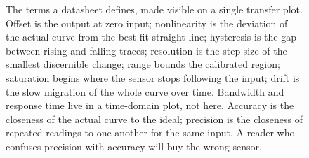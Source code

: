 \begin{figure}[ht]
\begin{tikzpicture}[x=1cm, y=1cm, font=\small]
\end{tikzpicture}
\caption[Anatomy of a sensor specification]{The terms a datasheet
defines, made visible on a single transfer plot. Offset is the
output at zero input; nonlinearity is the deviation of the actual
curve from the best-fit straight line; hysteresis is the gap
between rising and falling traces; resolution is the step size of
the smallest discernible change; range bounds the calibrated
region; saturation begins where the sensor stops following the
input; drift is the slow migration of the whole curve over time.
Bandwidth and response time live in a time-domain plot, not here.
Accuracy is the closeness of the actual curve to the ideal;
precision is the closeness of repeated readings to one another for
the same input. A reader who confuses precision with accuracy
will buy the wrong sensor.}
\label{fig:vol01:ch05:spec-anatomy}
\end{figure}

